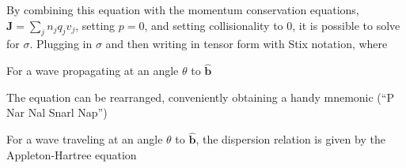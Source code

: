\noindent
By combining this equation with the momentum conservation equations, $\textbf{J} = \sum_{j} n_{j} q_{j} v_{j}$, 
setting $p = 0$, and setting collisionality to 0, it is possible to solve for
$\sigma$. Plugging in $\sigma$ and then writing in tensor form with
Stix notation,
\indent where 

\noindent For a wave propagating at an angle $\theta$ to $\hat{\textbf{b}}$ 

\noindent
The equation can be rearranged, conveniently obtaining a handy mnemonic (``P Nar Nal Snarl Nap'') 

\noindent For a wave traveling at an angle $\theta$ to $\hat{\textbf{b}}$, the dispersion relation is given by the Appleton-Hartree equation 

